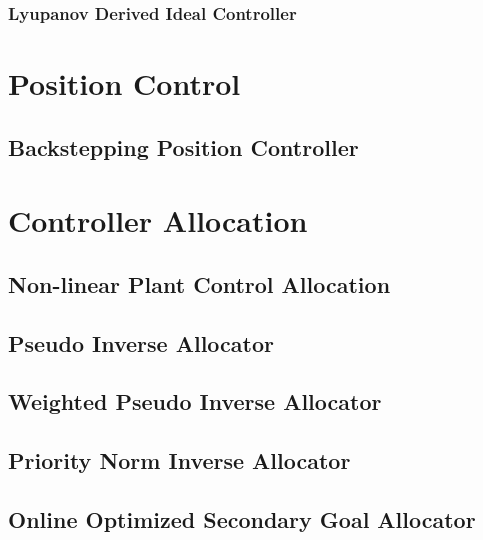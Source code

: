 \subsubsection{Lyupanov Derived Ideal Controller}

\section{Position Control}
\label{sec:control.position}
\subsection{Backstepping Position Controller}
\label{subsec:control.position.bacstepping}

\section{Controller Allocation}
\label{sec:control.allocation}
\subsection{Non-linear Plant Control Allocation}
\label{subsec:control.allocation.allocators}
\subsection{Pseudo Inverse Allocator}
\subsection{Weighted Pseudo Inverse Allocator}
\subsection{Priority Norm Inverse Allocator}
\subsection{Online Optimized Secondary Goal Allocator}
